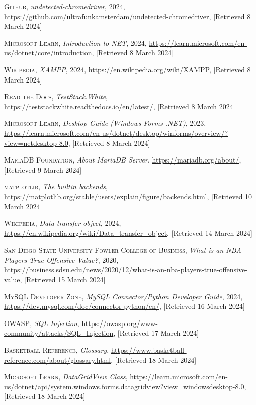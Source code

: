 \documentclass{thesis-ekf}
\theoremstyle{definition}
\theoremstyle{remark}
\begin{document}
\begin{thebibliography}{2}
\textsc{Github},
\emph{undetected-chromedriver}, 2024, 
\url{https://github.com/ultrafunkamsterdam/undetected-chromedriver}, [Retrieved 8 March 2024]

\textsc{Microsoft Learn},
\emph{Introduction to NET}, 2024, 
\url{https://learn.microsoft.com/en-us/dotnet/core/introduction}, [Retrieved 8 March 2024]

\textsc{Wikipedia},
\emph{XAMPP}, 2024,
\url{https://en.wikipedia.org/wiki/XAMPP}, [Retrieved 8 March 2024]

\textsc{Read the Docs},
\emph{TestStack.White},
\url{https://teststackwhite.readthedocs.io/en/latest/}, [Retrieved 8 March 2024]

\textsc{Microsoft Learn},
\emph{Desktop Guide (Windows Forms .NET)}, 2023,
\url{https://learn.microsoft.com/en-us/dotnet/desktop/winforms/overview/?view=netdesktop-8.0}, [Retrieved 8 March 2024]

\textsc{MariaDB Foundation},
\emph{About MariaDB Server},
\url{https://mariadb.org/about/}, [Retrieved 9 March 2024]

\textsc{matplotlib},
\emph{The builtin backends},
\url{https://matplotlib.org/stable/users/explain/figure/backends.html}, [Retrieved 10 March 2024]

\textsc{Wikipedia},
\emph{Data transfer object}, 2024,
\url{https://en.wikipedia.org/wiki/Data_transfer_object}, [Retrieved 14 March 2024]

\textsc{San Diego State University Fowler College of Business},
\emph{What is an NBA Players True Offensive Value?}, 2020,
\url{https://business.sdsu.edu/news/2020/12/what-is-an-nba-players-true-offensive-value}, [Retrieved 15 March 2024]

\textsc{MySQL Developer Zone},
\emph{MySQL Connector/Python Developer Guide}, 2024,
\url{https://dev.mysql.com/doc/connector-python/en/}, [Retrieved 16 March 2024]

\textsc{OWASP},
\emph{SQL Injection},
\url{https://owasp.org/www-community/attacks/SQL_Injection}, [Retrieved 17 March 2024]

\textsc{Basketball Reference},
\emph{Glossary},
\url{https://www.basketball-reference.com/about/glossary.html}, [Retrieved 18 March 2024]

\textsc{Microsoft Learn},
\emph{DataGridView Class},
\url{https://learn.microsoft.com/en-us/dotnet/api/system.windows.forms.datagridview?view=windowsdesktop-8.0}, [Retrieved 18 March 2024]


\end{thebibliography}
\end{document}
